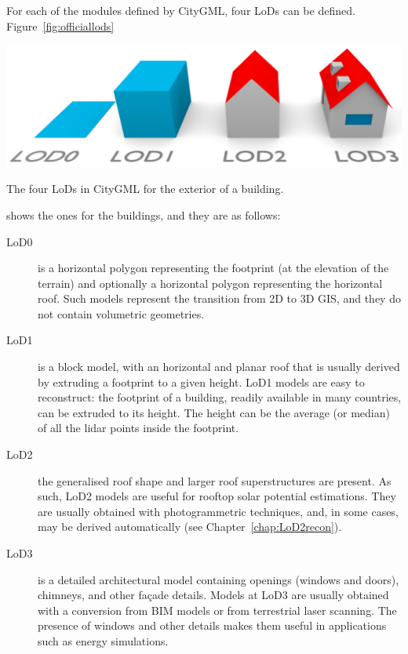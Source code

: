 For each of the modules defined by CityGML, four LoDs can be defined.
Figure~\ref{fig:officiallods}
\begin{marginfigure}
  \centering
  \includegraphics[width=\textwidth]{figs/CityGML-LODs-c3.png}
  \caption{The four LoDs in CityGML for the exterior of a building.}%
\label{fig:officiallods}
\end{marginfigure}
shows the ones for the buildings, and they are as follows:
\begin{description}
  \item[LoD0] is a horizontal polygon representing the footprint (at the elevation of the terrain) and optionally a horizontal polygon representing the horizontal roof.
  Such models represent the transition from 2D to 3D GIS, and they do not contain volumetric geometries.
  \item[LoD1] is a block model, with an horizontal and planar roof that is usually derived by extruding a footprint to a given height.
  LoD1 models are easy to reconstruct: the footprint of a building, readily available in many countries, can be extruded to its height. The height can be the average (or median) of all the lidar points inside the footprint.
  \item[LoD2] the generalised roof shape and larger roof superstructures are present.
  As such, LoD2 models are useful for rooftop solar potential estimations.
  They are usually obtained with photogrammetric techniques, and, in some cases, may be derived automatically (see Chapter~\ref{chap:LoD2recon}). 
  \item[LoD3] is a detailed architectural model containing openings (windows and doors), chimneys, and other façade details.
  Models at LoD3 are usually obtained with a conversion from BIM models or from terrestrial laser scanning.
  The presence of windows and other details makes them useful in applications such as energy simulations.
\end{description}

%

